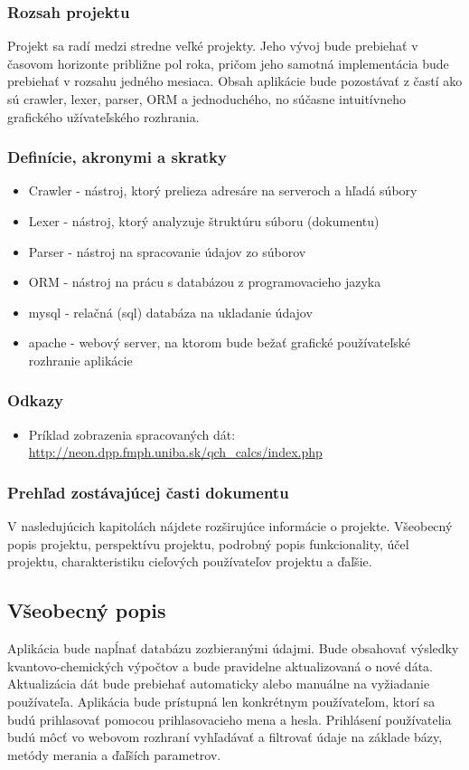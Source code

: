 \documentclass[12pt,a4paper]{article}
\begin{document}
\subsubsection{Rozsah projektu}
Projekt sa radí medzi stredne veľké projekty. Jeho vývoj bude prebiehať v časovom horizonte približne pol roka, pričom jeho samotná implementácia bude prebiehať v rozsahu jedného mesiaca. Obsah aplikácie bude pozostávať z častí ako sú crawler, lexer, parser, ORM a jednoduchého, no súčasne intuitívneho grafického užívateľského rozhrania.

\subsubsection{Definície, akronymi a skratky}
\begin{itemize}
	\item Crawler - nástroj, ktorý prelieza adresáre na serveroch a hľadá súbory
	\item Lexer - nástroj, ktorý analyzuje štruktúru súboru (dokumentu)
	\item Parser - nástroj na spracovanie údajov zo súborov
	\item ORM - nástroj na prácu s databázou z programovacieho jazyka
	\item mysql - relačná (sql) databáza na ukladanie údajov
	\item apache - webový server, na ktorom bude bežať grafické používateľské rozhranie aplikácie
\end{itemize}

\subsubsection{Odkazy}
\begin{itemize}
	\item Príklad zobrazenia spracovaných dát: \url{http://neon.dpp.fmph.uniba.sk/qch_calcs/index.php}
\end{itemize}

\subsubsection{Prehľad zostávajúcej časti dokumentu}
V nasledujúcich kapitolách nájdete rozširujúce informácie o projekte. Všeobecný popis projektu, perspektívu projektu, podrobný popis funkcionality, účel projektu, charakteristiku cieľových používateľov projektu a ďaľšie.

\subsection{Všeobecný popis}
Aplikácia bude napĺnať databázu zozbieranými údajmi. Bude obsahovať výsledky kvantovo-chemických výpočtov a bude pravidelne aktualizovaná o nové dáta. Aktualizácia dát bude prebiehať automaticky alebo manuálne na vyžiadanie používateľa. Aplikácia bude prístupná len konkrétnym používateľom, ktorí sa budú prihlasovať pomocou prihlasovacieho mena a hesla. Prihlásení používatelia budú môcť vo webovom rozhraní vyhľadávať a filtrovať údaje na základe bázy, metódy merania a ďaľších parametrov. 
\end{document}
